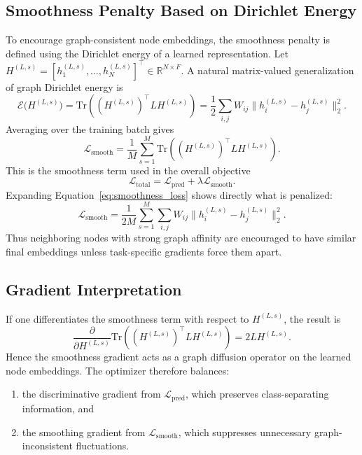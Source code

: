 \subsection{Smoothness Penalty Based on Dirichlet Energy}

To encourage graph-consistent node embeddings, the smoothness penalty is defined using the Dirichlet energy of a learned representation. Let \(H^{(L,s)}=[h_1^{(L,s)},\dots,h_N^{(L,s)}]^\top\in\mathbb{R}^{N\times F}\). A natural matrix-valued generalization of graph Dirichlet energy is %
\begin{equation}
\label{eq:matrix_dirichlet}
\mathcal{E}\!\big(H^{(L,s)}\big)
=
\mathrm{Tr}\!\left((H^{(L,s)})^\top L H^{(L,s)}\right) %
=
\frac{1}{2}\sum_{i,j}W_{ij}\|h_i^{(L,s)}-h_j^{(L,s)}\|_2^2.
\end{equation}
Averaging over the training batch gives
\begin{equation}
\label{eq:smoothness_loss}
\mathcal{L}_{\mathrm{smooth}}
=
\frac{1}{M}\sum_{s=1}^{M}
\mathrm{Tr}\!\left((H^{(L,s)})^\top L H^{(L,s)}\right). %
\end{equation}
This is the smoothness term used in the overall objective
\begin{equation}
\label{eq:full_training_objective}
\mathcal{L}_{\mathrm{total}}
=
\mathcal{L}_{\mathrm{pred}}
+
\lambda \mathcal{L}_{\mathrm{smooth}}.
\end{equation}
Expanding Equation~\eqref{eq:smoothness_loss} shows directly what is penalized:
\begin{equation}
\mathcal{L}_{\mathrm{smooth}}
=
\frac{1}{2M}\sum_{s=1}^{M}\sum_{i,j}W_{ij}
\|h_i^{(L,s)} - h_j^{(L,s)}\|_2^2.
\end{equation}
Thus neighboring nodes with strong graph affinity are encouraged to have similar final embeddings unless task-specific gradients force them apart.

\subsection{Gradient Interpretation}

If one differentiates the smoothness term with respect to \(H^{(L,s)}\), the result is
\begin{equation}
\frac{\partial}{\partial H^{(L,s)}}
\mathrm{Tr}\!\left((H^{(L,s)})^\top L H^{(L,s)}\right) %
=
2L H^{(L,s)}.
\end{equation}
Hence the smoothness gradient acts as a graph diffusion operator on the learned node embeddings. The optimizer therefore balances:
\begin{enumerate}[label=(\arabic*)] %
    \item the discriminative gradient from \(\mathcal{L}_{\mathrm{pred}}\), which preserves class-separating information, and
    \item the smoothing gradient from \(\mathcal{L}_{\mathrm{smooth}}\), which suppresses unnecessary graph-inconsistent fluctuations.
\end{enumerate}


